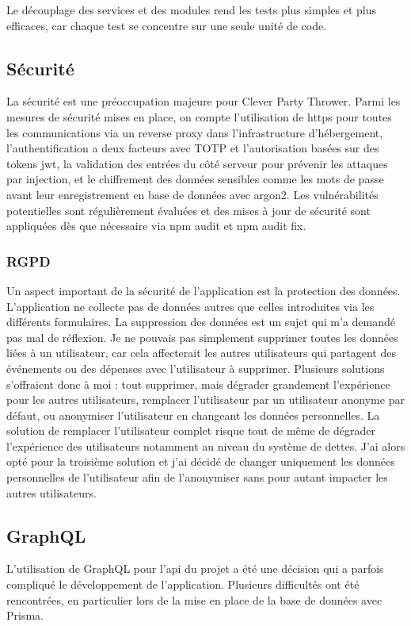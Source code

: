 Le découplage des services et des modules rend les tests plus simples et plus efficaces, car chaque test se concentre sur une seule unité de code.

\subsection{Sécurité}\label{subsec:securite}
La sécurité est une préoccupation majeure pour Clever Party Thrower.
Parmi les mesures de sécurité mises en place, on compte l'utilisation de \Gls{https} pour toutes les communications via un reverse proxy dans l'infrastructure d'hébergement,
l'authentification a deux facteurs avec TOTP et l'autorisation basées sur des tokens \Gls{jwt}, la validation des entrées du côté serveur pour prévenir les attaques par injection,
et le chiffrement des données sensibles comme les mots de passe avant leur enregistrement en base de données avec argon2.
Les vulnérabilités potentielles sont régulièrement évaluées et des mises à jour de sécurité sont appliquées dès que nécessaire via \Gls{npm} audit et \Gls{npm} audit fix.

\subsubsection{RGPD}
Un aspect important de la sécurité de l'application est la protection des données.
L'application ne collecte pas de données autres que celles introduites via les différents formulaires.
La suppression des données est un sujet qui m'a demandé pas mal de réflexion.
Je ne pouvais pas simplement supprimer toutes les données liées à un utilisateur, car cela affecterait les autres utilisateurs qui partagent des événements ou des dépenses avec l'utilisateur à supprimer.
Plusieurs solutions s'offraient donc à moi : tout supprimer, mais dégrader grandement l'expérience pour les autres utilisateurs, remplacer l'utilisateur par un utilisateur anonyme par défaut, ou anonymiser l'utilisateur en changeant les données personnelles.
La solution de remplacer l'utilisateur complet risque tout de même de dégrader l'expérience des utilisateurs notamment au niveau du système de dettes.
J'ai alors opté pour la troisième solution et j'ai décidé de changer uniquement les données personnelles de l'utilisateur afin de l'anonymiser sans pour autant impacter les autres utilisateurs.

\subsection{GraphQL}\label{subsec:graphql}
L'utilisation de GraphQL pour l'\Gls{api} du projet a été une décision qui a parfois compliqué le développement de l'application.
Plusieurs difficultés ont été rencontrées, en particulier lors de la mise en place de la base de données avec Prisma.\\


